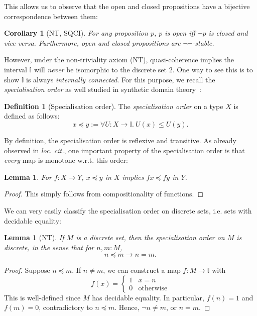 \documentclass[12pt]{amsart}
\newtheorem{lemma}[theorem]{Lemma}
\newtheorem{corollary}[theorem]{Corollary}
\theoremstyle{definition}
\newtheorem{definition}[theorem]{Definition}
\newcommand{\mbb}[1]{\mathbb{#1}}
\newcommand{\I}{\mbb I}
\newcommand{\other}{\mathrm{otherwise}}
\newcommand{\dneg}{\neg\neg}
\newcommand{\fa}[2]{\forall #1\!\colon\!\!#2.\ }
\begin{document}
This allows us to observe that the open and closed propositions have a bijective correspondence between them:

\begin{corollary}[NT, SQCI]\label{cor:opendnegclose}
  For any proposition $p$, $p$ is open iff $\neg p$ is closed and vice versa. Furthermore, open and closed propositions are $\dneg$-stable.
\end{corollary}

However, under the non-triviality axiom (NT), quasi-coherence implies the interval $\I$ will \emph{never} be isomorphic to the discrete set $2$. One way to see this is to show $\I$ is always \emph{internally connected}. For this purpose, we recall the \emph{specialisation order} as well studied in synthetic domain theory~\cite{PhoaWesleyKym-Son1991DtiR}:

\begin{definition}[Specialisation order]\label{defn:specialisation}
  The \emph{specialisation order} on a type $X$ is defined as follows:
  \[ x \preceq y := \fa{U}{X\to\I} U(x) \le U(y). \]
\end{definition}

By definition, the specialisation order is reflexive and transitive. As already observed in \emph{loc. cit.}, one important property of the specialisation order is that \emph{every} map is monotone w.r.t. this order:

\begin{lemma}\label{lem:anymapmonotoneintriscorder}
  For $f : X \to Y$, $x \preceq y$ in $X$ implies $fx \preceq fy$ in $Y$.
\end{lemma}
\begin{proof}
  This simply follows from compositionality of functions.
\end{proof}

We can very easily classify the specialisation order on discrete sets, i.e. sets with decidable equality:

\begin{lemma}[NT]\label{lem:discretephoa}
  If $M$ is a discrete set, then the specialisation order on $M$ is discrete, in the sense that for $n,m : M$,
  \[ n \preceq m \to n = m. \]
\end{lemma}
\begin{proof}
  Suppose $n \preceq m$. If $n \neq m$, we can construct a map $f : M \to \I$ with 
  \[ f(x) =
  \begin{cases}
    1 & x = n \\ 
    0 & \other
  \end{cases}
  \]
  This is well-defined since $M$ has decidable equality. In particular, $f(n) = 1$ and $f(m) = 0$, contradictory to $n \preceq m$. Hence, $\neg n \neq m$, or $n = m$.
\end{proof}
\end{document}
